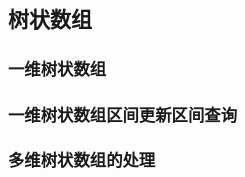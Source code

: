 \subsection{树状数组}
\subsubsection{一维树状数组}


\subsubsection{一维树状数组区间更新区间查询}


\subsubsection{多维树状数组的处理}

